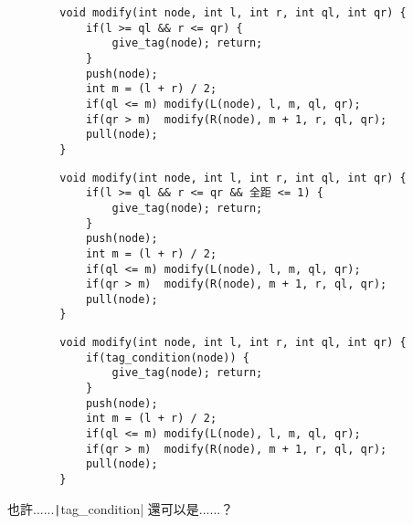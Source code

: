 \begin{frame}[fragile]{\ebtitle}
    \begin{verbatim}
        void modify(int node, int l, int r, int ql, int qr) {
            if(l >= ql && r <= qr) {
                give_tag(node); return;
            }
            push(node);
            int m = (l + r) / 2;
            if(ql <= m) modify(L(node), l, m, ql, qr);
            if(qr > m)  modify(R(node), m + 1, r, ql, qr);
            pull(node);
        }
    \end{verbatim}
\end{frame}

\begin{frame}[fragile]{\ebtitle}
    \begin{verbatim}
        void modify(int node, int l, int r, int ql, int qr) {
            if(l >= ql && r <= qr && 全距 <= 1) {
                give_tag(node); return;
            }
            push(node);
            int m = (l + r) / 2;
            if(ql <= m) modify(L(node), l, m, ql, qr);
            if(qr > m)  modify(R(node), m + 1, r, ql, qr);
            pull(node);
        }
    \end{verbatim}
\end{frame}

\begin{frame}[fragile]{\ebtitle}
    \begin{verbatim}
        void modify(int node, int l, int r, int ql, int qr) {
            if(tag_condition(node)) {
                give_tag(node); return;
            }
            push(node);
            int m = (l + r) / 2;
            if(ql <= m) modify(L(node), l, m, ql, qr);
            if(qr > m)  modify(R(node), m + 1, r, ql, qr);
            pull(node);
        }
    \end{verbatim}
\end{frame}

\begin{frame}{\ebtitle}
    也許......\texttt|tag_condition| 還可以是......？
\end{frame}

